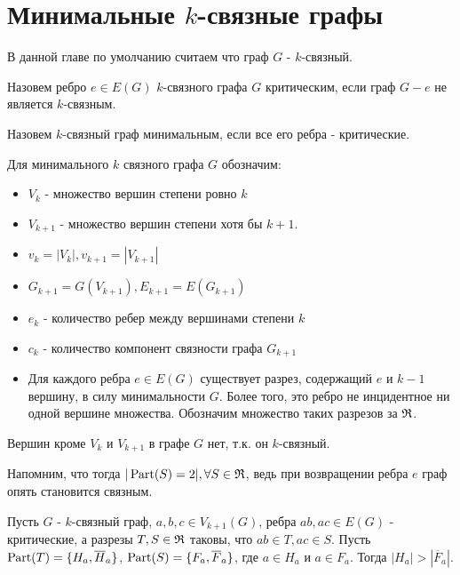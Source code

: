 
\section{Минимальные $k$-связные графы}

В данной главе по умолчанию считаем что граф $G$ -  $k$-связный. 

\begin{df}
	Назовем ребро $e \in E(G)$ $k$-связного графа  $G$ критическим, если граф  $G - e$ не является  $k$-связным.
\end{df}

\begin{df}
	Назовем $k$-связный граф минимальным, если все его ребра - критические.
\end{df}

\begin{prop} \label{prop:for_minimum_k_connected_graph}
	Для минимального $k$ связного графа  $G$ обозначим:
	 \begin{itemize}
		 \item $V_k$ - множество вершин степени ровно  $k$
		 \item  $V_{k +1}$ - множество вершин степени хотя бы  $k + 1$. 
		 \item $v_k = |V_k|, v_{k + 1} = |V_{k + 1}|$
		 \item  $G_{k+1} = G(V_{k + 1}), E_{k + 1} = E(G_{k + 1})$
		\item  $e_k$ - количество ребер между вершинами степени  $k$
		\item $c_k$ - количество компонент связности графа  $G_{k + 1}$
		\item Для каждого ребра  $e \in E(G)$ существует разрез, содержащий  $e$ и  $k - 1$ вершину, в силу минимальности $G$. Более того, это ребро не инцидентное ни одной вершине множества.
			Обозначим множество таких разрезов за  $\mathfrak{R}$.
	\end{itemize}

	Вершин кроме $V_k$ и  $V_{k+1}$ в графе  $G$ нет, т.к. он  $k$-связный.
\end{prop}

Напомним, что тогда $|\operatorname{Part}(S) = 2|, \forall S \in \mathfrak{R}$, ведь при возвращении ребра  $e$ граф опять становится связным.

\begin{lm} \label{lemma:3_1}
	Пусть $G$ -  $k$-связный граф,  $a, b, c \in V_{k + 1}(G)$, ребра  $ab, ac \in E(G)$ - критические, а разрезы  $T, S \in \mathfrak{R}$ таковы, что $ab \in T, ac \in S$.
	Пусть  $\operatorname{Part}(T) = \{H_a, \overline H_a\}$,  $\operatorname{Part}(S) = \{F_a, \overline F_a\}$, где  $a \in H_a$ и  $a \in F_a$.
		Тогда  $|H_a| > |\overline F_a|$.
\end{lm}

